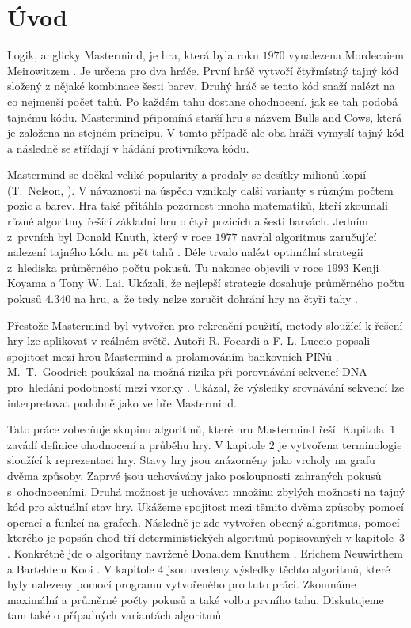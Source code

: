 \chapter*{Úvod}

Logik, anglicky Mastermind, je hra, která byla roku $1970$ vynalezena Mordecaiem Meirowitzem \cite{Nelson-history}. Je určena pro dva hráče. První hráč vytvoří čtyřmístný tajný kód složený z nějaké kombinace šesti barev. Druhý hráč se tento kód snaží nalézt na co nejmenší počet tahů. Po každém tahu dostane ohodnocení, jak se tah podobá tajnému kódu. Mastermind připomíná starší hru s názvem Bulls and Cows, která je založena na stejném principu. V tomto případě ale oba hráči vymyslí tajný kód a následně se střídají v hádání protivníkova kódu. 

Mastermind se dočkal veliké popularity a prodaly se desítky milionů kopií (T.~Nelson, \cite{Nelson-history}). V návaznosti na úspěch vznikaly další varianty s různým počtem pozic a barev. Hra také přitáhla pozornost mnoha matematiků, kteří zkoumali různé algoritmy řešící základní hru o čtyř pozicích a šesti barvách. Jedním z~prvních byl Donald Knuth, který v roce $1977$ navrhl algoritmus zaručující nalezení tajného kódu na pět tahů \cite{donald_e__knuth_1977}. Déle trvalo nalézt optimální strategii z~hlediska průměrného počtu pokusů. Tu nakonec objevili v roce $1993$ Kenji Koyama a Tony W. Lai. Ukázali, že nejlepší strategie dosahuje průměrného počtu pokusů $4.340$ na hru, a~že tedy nelze zaručit dohrání hry na čtyři tahy \cite{koyama}. 

Přestože Mastermind byl vytvořen pro rekreační použití, metody sloužící k řešení hry lze aplikovat v reálném světě. Autoři R. Focardi a F. L. Luccio popsali spojitost mezi hrou Mastermind a prolamováním bankovních PINů \cite{Bank-pins-Focardi}. M.~T.~Goodrich poukázal na možná rizika při porovnávání sekvencí DNA pro~hledání podobností mezi vzorky \cite{goodrich-dna}. Ukázal, že výsledky srovnávání sekvencí lze interpretovat podobně jako ve hře Mastermind. 


Tato práce zobecňuje skupinu algoritmů, které hru Mastermind řeší. Kapitola~$1$ zavádí definice ohodnocení a průběhu hry. V kapitole $2$ je vytvořena terminologie sloužící k reprezentaci hry. Stavy hry jsou znázorněny jako vrcholy na grafu dvěma způsoby. Zaprvé jsou uchovávány jako posloupnosti zahraných pokusů s~ohodnoceními. Druhá možnost je uchovávat množinu zbylých možností na tajný kód pro aktuální stav hry. Ukážeme spojitost mezi těmito dvěma způsoby pomocí operací a funkcí na grafech. Následně je zde vytvořen obecný algoritmus, pomocí kterého je popsán chod tří deterministických algoritmů popisovaných v kapitole~$3$. Konkrétně jde o algoritmy navržené Donaldem Knuthem \cite{donald_e__knuth_1977}, Erichem Neuwirthem \cite{neuwirth} a Barteldem Kooi \cite{kooi}. V kapitole $4$ jsou uvedeny výsledky těchto algoritmů, které byly nalezeny pomocí programu vytvořeného pro tuto práci. Zkoumáme maximální a průměrné počty pokusů a také volbu prvního tahu. Diskutujeme tam také o případných variantách algoritmů. 